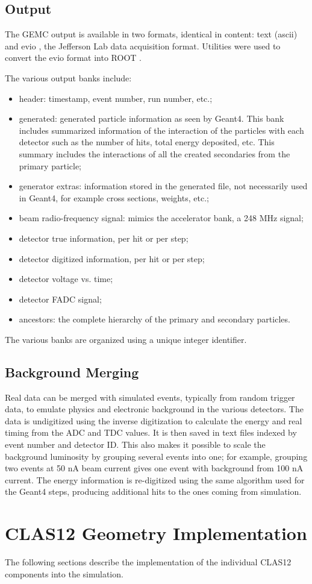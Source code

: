\subsection{Output}

The GEMC output is available in two formats, identical in content: text (ascii) and evio \cite{evio}, the Jefferson Lab
data acquisition format.
Utilities were used to convert the evio format into ROOT \cite{root}.

The various output banks include:

\begin{itemize}
	\item header: timestamp, event number, run number, etc.;
	\item generated: generated particle information as seen by Geant4. This bank includes summarized information of the interaction of
                     the particles with each detector such as the number of hits, total energy deposited, etc. This summary includes
                     the interactions of all the created secondaries from the primary particle;
	\item generator extras: information stored in the generated file, not necessarily used in Geant4, for example cross sections, weights, etc.;
	\item beam radio-frequency signal: mimics the accelerator bank, a 248 MHz signal;
	\item detector true information, per hit or per step;
	\item detector digitized information, per hit or per step;
	\item detector voltage vs. time;
	\item detector FADC signal;
	\item ancestors: the complete hierarchy of the primary and secondary particles.
\end{itemize}

The various banks are organized using a unique integer identifier.

\subsection{Background Merging}

Real data can be merged with simulated events, typically from random trigger data, to emulate physics and electronic background in
the various detectors.
The data is un\-digitized using the inverse digitization to calculate the energy and real timing from the ADC and TDC values.
It is then saved in text files indexed by event number and detector ID. This also makes it possible to scale the background luminosity by grouping
several events into one; for example, grouping two events at 50 nA beam current gives one event with background from 100 nA current.
The energy information is re-digitized using the same algorithm used for the Geant4 steps, producing additional hits to the ones coming from simulation.


\section{CLAS12 Geometry Implementation}

The following sections describe the implementation of the individual CLAS12 components into the simulation.
